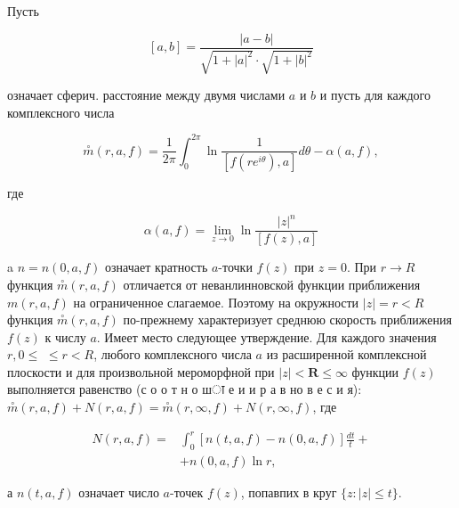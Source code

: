 \documentclass[10pt]{article}
\begin{document}
Пусть



\[

[a, b]=\frac{|a-b|}{\sqrt{1+|a|^{2}} \cdot \sqrt{1+|b|^{2}}}

\]



означает сферич. расстояние между двумя числами $a$ и $b$ и пусть для каждого комплексного числа



\[

\stackrel{\circ}{m}(r, a, f)=\frac{1}{2 \pi} \int_{0}^{2 \pi} \ln \frac{1}{\left[f\left(r e^{i \theta}\right), a\right]} d \theta-\alpha(a, f),

\]



где



\[

\alpha(a, f)=\lim _{z \rightarrow 0} \ln \frac{|z|^{n}}{[f(z), a]}

\]



a $n=n(0, a, f)$ означает кратность $a$-точки $f(z)$ при $z=0$. При $r \rightarrow R$ функция $\stackrel{\circ}{m}(r, a, f)$ отличается от неванлинновской функции приближения $m(r, a, f)$ на ограниченное слагаемое. Поэтому на окружности $|z|=r<R$ функция $\stackrel{\circ}{m}(r, a, f)$ по-прежнему характеризует среднюю скорость приближения $f(z)$ к числу $a$. Имеет место следующее утверждение. Для каждого значения $r, 0 \leqslant$ $\leqslant r<R$, любого комплексного числа $a$ из расширенной комплексной плоскости и для произвольной мероморфной при $|z|<\boldsymbol{R} \leqslant \infty$ функции $f(z)$ выполняется равенство (с о о т н о шा е и и р а в но в е с и я): $\stackrel{\circ}{m}(r, a, f)+N(r, a, f)=\stackrel{\circ}{m}(r, \infty, f)+N(r, \infty, f)$, где



\[

\begin{aligned}

N(r, a, f)= & \int_{0}^{r}[n(t, a, f)-n(0, a, f)] \frac{d t}{t}+ \\

& +n(0, a, f) \ln r,

\end{aligned}

\]



а $n(t, a, f)$ означает число $a$-точек $f(z)$, попавпих в круг $\{z:|z| \leqslant t\}$.
\end{document}

